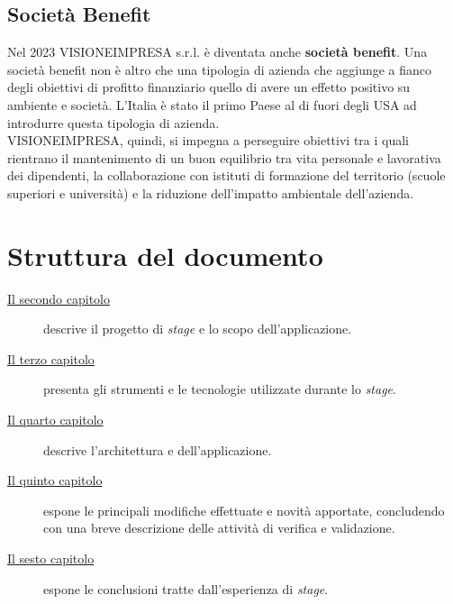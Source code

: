 \subsection{Società Benefit}

Nel 2023 VISIONEIMPRESA s.r.l. è diventata anche \textbf{società benefit}. Una società benefit non è altro che una tipologia di azienda che aggiunge a fianco degli obiettivi di profitto finanziario quello di avere un effetto positivo su ambiente e società. L'Italia è stato il primo Paese al di fuori degli USA ad introdurre questa tipologia di azienda.\\
VISIONEIMPRESA, quindi, si impegna a perseguire obiettivi tra i quali rientrano il mantenimento di un buon equilibrio tra vita personale e lavorativa dei dipendenti, la collaborazione con istituti di formazione del territorio (scuole superiori e università) e la riduzione dell'impatto ambientale dell'azienda.

\section{Struttura del documento}

\begin{description} 
    \item[{\hyperref[cap:descrizione-stage]{Il secondo capitolo}}] descrive il progetto di \textit{stage} e lo scopo dell'applicazione.
    
    \item[{\hyperref[cap:tecnologie-strumenti]{Il terzo capitolo}}] presenta gli strumenti e le tecnologie utilizzate durante lo \textit{stage}.
    
    \item[{\hyperref[cap:design]{Il quarto capitolo}}] descrive l'architettura e dell'applicazione.
    
    \item[{\hyperref[cap:codifica]{Il quinto capitolo}}] espone le principali modifiche effettuate e novità apportate, concludendo con una breve descrizione delle attività di verifica e validazione.
    
    \item[{\hyperref[cap:conclusioni]{Il sesto capitolo}}] espone le conclusioni tratte dall'esperienza di \textit{stage}.
\end{description}
